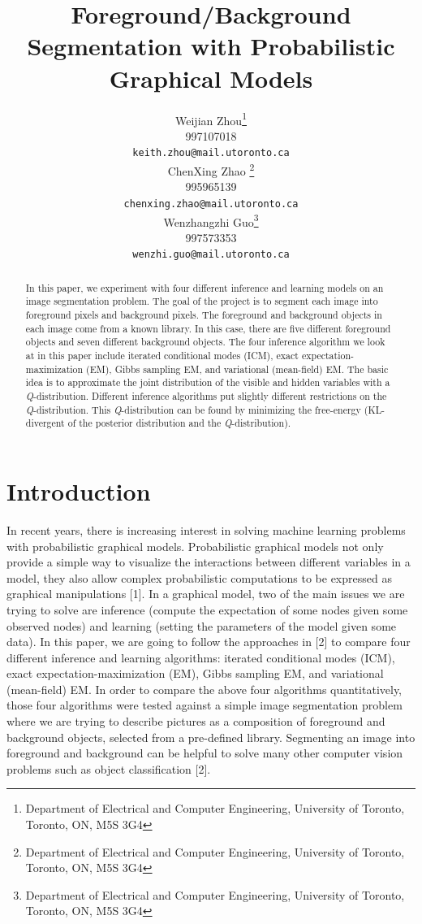 \documentclass{article} %
\title{Foreground/Background Segmentation with Probabilistic Graphical Models}
\author{
Weijian Zhou\thanks{Department of Electrical and Computer Engineering, University of Toronto, Toronto, ON, M5S 3G4} \\
997107018 \\
\texttt{keith.zhou@mail.utoronto.ca} \\
\And
ChenXing Zhao \thanks{Department of Electrical and Computer Engineering, University of Toronto, Toronto, ON, M5S 3G4} \\
995965139\\
\texttt{chenxing.zhao@mail.utoronto.ca} \\
\AND
Wenzhangzhi Guo\thanks{Department of Electrical and Computer Engineering, University of Toronto, Toronto, ON, M5S 3G4} \\
997573353 \\
\texttt{wenzhi.guo@mail.utoronto.ca} \\
}
\begin{document}
\maketitle

\begin{abstract}
In this paper, we experiment with four different inference and learning models on an image segmentation problem. The goal of the project is to segment each image into foreground pixels and background pixels. The foreground and background objects in each image come from a known library. In this case, there are five different foreground objects and seven different background objects. The four inference algorithm we look at in this paper include iterated conditional modes (ICM), exact expectation-maximization (EM), Gibbs sampling EM, and variational (mean-field) EM. The basic idea is to approximate the joint distribution of the visible and hidden variables with a \textit{Q}-distribution. Different inference algorithms put slightly different restrictions on the \textit{Q}-distribution. This \textit{Q}-distribution can be found by minimizing the free-energy (KL-divergent of the posterior distribution and the \textit{Q}-distribution).
\end{abstract}

\section{Introduction}
\label{intro}
In recent years, there is increasing interest in solving machine learning problems with probabilistic graphical models. Probabilistic graphical models not only provide a simple way to visualize the interactions between different variables in a model, they also allow complex probabilistic computations to be expressed as graphical manipulations [1]. In a graphical model, two of the main issues we are trying to solve are inference (compute the expectation of some nodes given some observed nodes) and learning (setting the parameters of the model given some data). In this paper, we are going to follow the approaches in [2] to compare four different inference and learning algorithms: iterated conditional modes (ICM), exact expectation-maximization (EM), Gibbs sampling EM, and variational (mean-field) EM. In order to compare the above four algorithms quantitatively, those four algorithms were tested against a simple image segmentation problem where we are trying to describe pictures as a composition of foreground and background objects, selected from a pre-defined library. Segmenting an image into foreground and background can be helpful to solve many other computer vision problems such as object classification [2].
\end{document}
